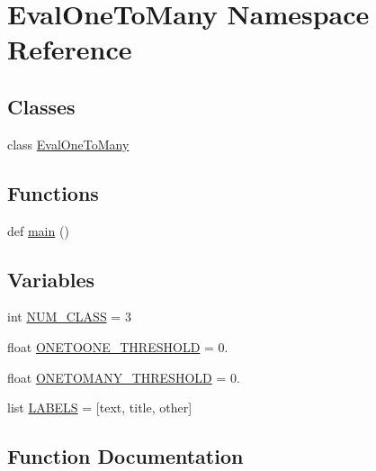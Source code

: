 \hypertarget{namespace_eval_one_to_many}{}\section{Eval\+One\+To\+Many Namespace Reference}
\label{namespace_eval_one_to_many}
\subsection*{Classes}
\begin{DoxyCompactItemize}
\item 
class \hyperlink{class_eval_one_to_many_1_1_eval_one_to_many}{Eval\+One\+To\+Many}
\end{DoxyCompactItemize}
\subsection*{Functions}
\begin{DoxyCompactItemize}
\item 
def \hyperlink{namespace_eval_one_to_many_ae5de45ab836048b3c6a05d4f3e62de45}{main} ()
\end{DoxyCompactItemize}
\subsection*{Variables}
\begin{DoxyCompactItemize}
\item 
int \hyperlink{namespace_eval_one_to_many_a786455f45b24198ca26ce862895d3173}{N\+U\+M\+\_\+\+C\+L\+A\+S\+S} = 3
\item 
float \hyperlink{namespace_eval_one_to_many_a62d695244299265d4e815fccfa8931fb}{O\+N\+E\+T\+O\+O\+N\+E\+\_\+\+T\+H\+R\+E\+S\+H\+O\+L\+D} = 0.
\item 
float \hyperlink{namespace_eval_one_to_many_a9ba5d6a478984ee6ae5ab02fdae84951}{O\+N\+E\+T\+O\+M\+A\+N\+Y\+\_\+\+T\+H\+R\+E\+S\+H\+O\+L\+D} = 0.
\item 
list \hyperlink{namespace_eval_one_to_many_a14b747290013b81686b3902a75a08706}{L\+A\+B\+E\+L\+S} = \mbox{[}\textquotesingle{}text\textquotesingle{}, \textquotesingle{}title\textquotesingle{}, \textquotesingle{}other\textquotesingle{}\mbox{]}
\end{DoxyCompactItemize}


\subsection{Function Documentation}
\hypertarget{namespace_eval_one_to_many_ae5de45ab836048b3c6a05d4f3e62de45}{}
